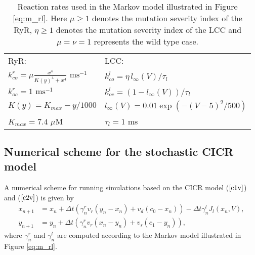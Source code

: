 \begin{table}
\begin{center}
\begin{tabular}[c]{|l|l|} \hline
RyR: & LCC: \\
$k_{co}^{r}=\mu \frac{x^4}{K(y)^4+x^4} \text{ ms}^{-1}$ &$k_{co}^{l}=\eta\, l_{\infty}(V)/\tau_l$ \\
$k_{oc}^{r}=1 \text{ ms}^{-1}$ & $k_{oc}^{l}=(1-l_{\infty}(V))/\tau_l$ \\
$K(y) =  K_{max}-y/1000$ &  $l_{\infty}(V) = 0.01 \exp(-(V-5)^{2}/500)$ \\
$K_{max} = 7.4$ $\mu$M & $\tau_l=1$ ms\\ \hline
\end{tabular}
\end{center}
\caption{Reaction rates used in the Markov model illustrated in 
Figure \ref{eq:m_rl}.
 Here $\mu \ge 1$ denotes the mutation severity
index of the RyR, $\eta \ge 1$ denotes the mutation severity
index of the LCC and $\mu=\nu=1$ represents the wild type case. 
\label{functions}
\label{tab:rate}}
\end{table}

\subsection{Numerical scheme for the stochastic CICR  model}

 A numerical scheme for running simulations based on the CICR model 
($\ref{c1v}$) and ($\ref{c2v}$)
is given by
\begin{align}
x_{n+1} &  =x_{n}+\Delta t\left(  \gamma_{n}^{r}v_{r}\left(  y_{n}%
-x_{n}\right)  +v_{d}\left(  c_{0}-x_{n}\right)  \right)  -\Delta t \gamma_{n}^{l}%
J_{l}(x_{n},V),\label{nc1v}\\
y_{n+1} &  =y_{n}+\Delta t\left(  \gamma_{n}^{r}v_{r}\left(  x_{n}%
-y_{n}\right)  +v_{s}\left(  c_{1}-y_{n}\right)  \right)  ,\label{nc2v}%
\end{align}
where $\gamma_{n}^{r}$ and $\gamma_{n}^{l}$ are computed according to the
Markov model illustrated in Figure \ref{eq:m_rl}.

